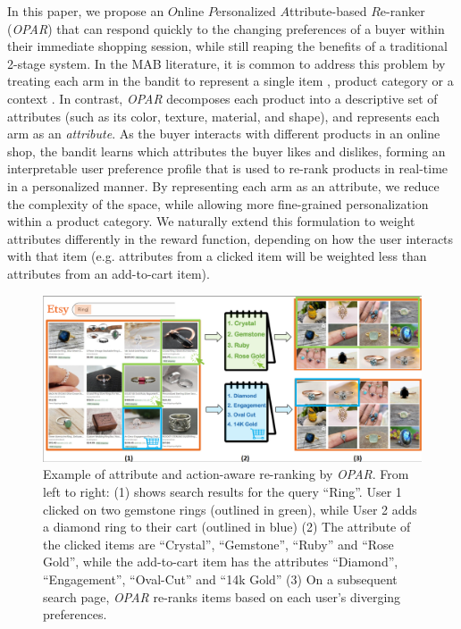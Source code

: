 \documentclass[11pt, dvipdfmx]{article}
\begin{document}
In this paper, we propose an $O$nline $P$ersonalized $A$ttribute-based $R$e-ranker (\emph{OPAR}) that can respond quickly to the changing preferences of a buyer within their immediate shopping session, while still reaping the benefits of a traditional 2-stage system. In the MAB literature, it is common to address this problem by treating each arm in the bandit to represent a single item \cite{kdd20_sequentialRec}, product category \cite{recsys16_amazon,MLKD19_JD_onlineRanking} or a context  \cite{KDD18_TaobaoSearch_RL, li2017contextaware,ICML16_contextCascadingBandits}. In contrast, \emph{OPAR} decomposes each product into a descriptive set of attributes (such as its color, texture, material, and shape), and represents each arm as an \emph{attribute}. As the buyer interacts with different products in an online shop, the bandit learns which attributes the buyer likes and dislikes, forming an interpretable user preference profile that is used to re-rank products in real-time in a personalized manner. By representing each arm as an attribute, we reduce the complexity of the space, while allowing more fine-grained personalization within a product category. We naturally extend this formulation to weight attributes differently in the reward function, depending on how the user interacts with that item (e.g. attributes from a clicked item will be weighted less than attributes from an add-to-cart item). 


\begin{figure}[!h]
    \centering
    \includegraphics[bb=-145 0 145 100]{figs/fig_toy-cropped_png}
    \caption{Example of attribute and action-aware re-ranking by \emph{OPAR}. From left to right: (1) shows search results for the query ``Ring''. User 1 clicked on two gemstone rings (outlined in green), while User 2 adds a diamond ring to their cart (outlined in blue) (2) The attribute of the clicked items are ``Crystal'', ``Gemstone'', ``Ruby'' and ``Rose Gold'', while the add-to-cart item has the attributes ``Diamond'', ``Engagement'', ``Oval-Cut'' and ``14k Gold'' (3) On a subsequent search page, \emph{OPAR} re-ranks items based on each user's diverging preferences.}
\label{fig:toy}
\end{figure}
\end{document}
